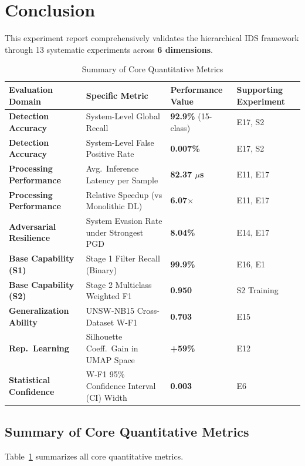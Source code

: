 \documentclass[sigconf]{acmart}
\begin{document}
\section{Conclusion}

This experiment report comprehensively validates the hierarchical IDS framework through 13 systematic experiments across \textbf{6 dimensions}.


\begin{table}[!t]
\caption{Summary of Core Quantitative Metrics}
\label{tab:core_metrics}
\begin{tabular}{p{3.8cm}p{5.0cm}p{3.0cm}p{3.0cm}}
\toprule
\textbf{Evaluation Domain} & \textbf{Specific Metric} & \textbf{Performance Value} & \textbf{Supporting Experiment} \\
\midrule
\textbf{Detection Accuracy} & System-Level Global Recall & \textbf{92.9\%} (15-class) & E17, S2 \\
\textbf{Detection Accuracy} & System-Level False Positive Rate & \textbf{0.007\%} & E17, S2 \\
\textbf{Processing Performance} & Avg.\ Inference Latency per Sample & \textbf{82.37 $\mu$s} & E11, E17 \\
\textbf{Processing Performance} & Relative Speedup (vs Monolithic DL) & \textbf{6.07$\times$} & E11, E17 \\
\textbf{Adversarial Resilience} & System Evasion Rate under Strongest PGD & \textbf{8.04\%} & E14, E17 \\
\textbf{Base Capability (S1)} & Stage 1 Filter Recall (Binary) & \textbf{99.9\%} & E16, E1 \\
\textbf{Base Capability (S2)} & Stage 2 Multiclass Weighted F1 & \textbf{0.950} & S2 Training \\
\textbf{Generalization Ability} & UNSW-NB15 Cross-Dataset W-F1 & \textbf{0.703} & E15 \\
\textbf{Rep.\ Learning} & Silhouette Coeff.\ Gain in UMAP Space & \textbf{+59\%} & E12 \\
\textbf{Statistical Confidence} & W-F1 95\% Confidence Interval (CI) Width & \textbf{0.003} & E6 \\
\bottomrule
\end{tabular}
\end{table}

\subsection{Summary of Core Quantitative Metrics} Table~\ref{tab:core_metrics} summarizes all core quantitative metrics.
\end{document}
